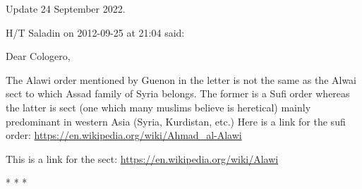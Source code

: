 \begin{quotex}
Update 24 September 2022.

H/T Saladin on 2012-09-25 at 21:04 said:

Dear Cologero,

The Alawi order mentioned by Guenon in the letter is not the same as the Alwai sect to which Assad family of Syria belongs. The former is a Sufi order whereas the latter is sect (one which many muslims believe is heretical) mainly predominant in western Asia (Syria, Kurdistan, etc.) Here is a link for the sufi order: \url{https://en.wikipedia.org/wiki/Ahmad\_al-Alawi}

This is a link for the sect: \url{https://en.wikipedia.org/wiki/Alawi}
\end{quotex}


\begin{center}* * *\end{center}

